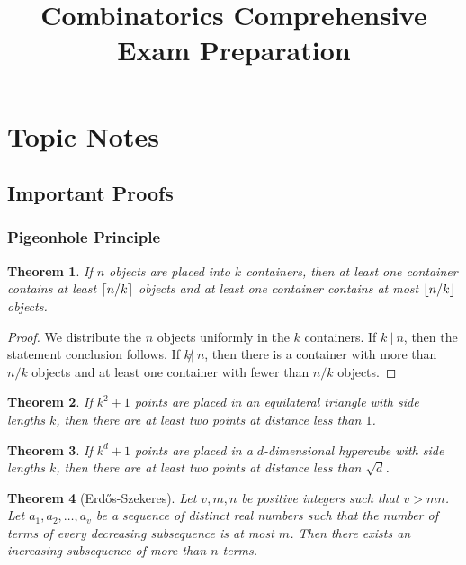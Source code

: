 \documentclass[12]{article}
\title{ \vspace{-3cm} Combinatorics Comprehensive Exam Preparation }
\DeclarePairedDelimiter\ceil{\lceil}{\rceil}
\DeclarePairedDelimiter\floor{\lfloor}{\rfloor}
\newtheorem{thm}{Theorem}[section] %
\theoremstyle{definition}
\begin{document}
	\maketitle
	\tableofcontents
	
	\section{Topic Notes}
	
	\subsection{Important Proofs}
	
	\subsubsection{Pigeonhole Principle}
	
	\begin{thm}
		If $n$ objects are placed into $k$ containers, then at least one container contains at least $\ceil{n/k}$ objects and at least one container contains at most $\floor{n/k}$ objects.
	\end{thm}
	\begin{proof}
		We distribute the $n$ objects uniformly in the $k$ containers.  If $k \ | \ n$, then the statement conclusion follows.  If $k  \not| \ n$, then there is a container with more than $n/k$ objects and at least one container with fewer than $n/k$ objects.
	\end{proof}
	
	\begin{thm}
		If $k^2+1$ points are placed in an equilateral triangle with side lengths $k$, then there are at least two points at distance less than $1$.
	\end{thm}

	\begin{thm}
		If $k^d + 1$ points are placed in a $d$-dimensional hypercube with side lengths $k$, then there are at least two points at distance less than $\sqrt{d}$.
	\end{thm}
	
	\begin{thm}[Erd\H{o}s-Szekeres]
		Let $v, m, n$ be positive integers such that $v > mn$.  Let $a_1, a_2, \ldots, a_v$ be a sequence of distinct real numbers such that the number of terms of every decreasing subsequence is at most $m$.  Then there exists an increasing subsequence of more than $n$ terms.
	\end{thm}
\end{document}
